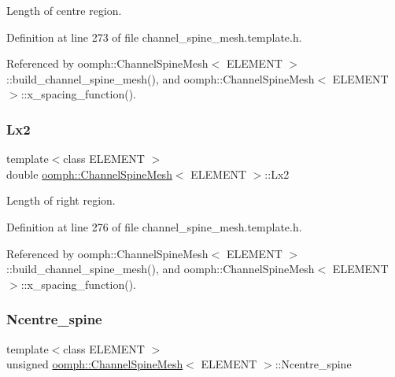 Length of centre region. 



Definition at line 273 of file channel\+\_\+spine\+\_\+mesh.\+template.\+h.



Referenced by oomph\+::\+Channel\+Spine\+Mesh$<$ E\+L\+E\+M\+E\+N\+T $>$\+::build\+\_\+channel\+\_\+spine\+\_\+mesh(), and oomph\+::\+Channel\+Spine\+Mesh$<$ E\+L\+E\+M\+E\+N\+T $>$\+::x\+\_\+spacing\+\_\+function().

\mbox{\label{classoomph_1_1ChannelSpineMesh_a4c295478a3f79335f5d0113da220844e}} 
\subsubsection{\texorpdfstring{Lx2}{Lx2}}
{\footnotesize\ttfamily template$<$class E\+L\+E\+M\+E\+NT $>$ \\
double \hyperlink{classoomph_1_1ChannelSpineMesh}{oomph\+::\+Channel\+Spine\+Mesh}$<$ E\+L\+E\+M\+E\+NT $>$\+::Lx2\hspace{0.3cm}{\ttfamily [protected]}}



Length of right region. 



Definition at line 276 of file channel\+\_\+spine\+\_\+mesh.\+template.\+h.



Referenced by oomph\+::\+Channel\+Spine\+Mesh$<$ E\+L\+E\+M\+E\+N\+T $>$\+::build\+\_\+channel\+\_\+spine\+\_\+mesh(), and oomph\+::\+Channel\+Spine\+Mesh$<$ E\+L\+E\+M\+E\+N\+T $>$\+::x\+\_\+spacing\+\_\+function().

\mbox{\label{classoomph_1_1ChannelSpineMesh_af6ef1bb007083a803561e5f0062f820b}} 
\subsubsection{\texorpdfstring{Ncentre\+\_\+spine}{Ncentre\_spine}}
{\footnotesize\ttfamily template$<$class E\+L\+E\+M\+E\+NT $>$ \\
unsigned \hyperlink{classoomph_1_1ChannelSpineMesh}{oomph\+::\+Channel\+Spine\+Mesh}$<$ E\+L\+E\+M\+E\+NT $>$\+::Ncentre\+\_\+spine\hspace{0.3cm}{\ttfamily [protected]}}



